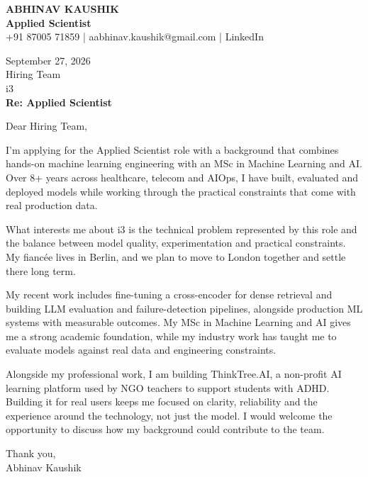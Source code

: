 \documentclass[10pt,a4paper]{article}
\begin{document}
\begin{center}
{\Large\bfseries ABHINAV KAUSHIK}\\[2pt]
{\bfseries Applied Scientist}\\[2pt]
+91 87005 71859 \quad | \quad aabhinav.kaushik@gmail.com \quad | \quad LinkedIn
\end{center}
\vspace{8pt}
September 27, 2026\\[6pt]
Hiring Team\\
i3\\[4pt]
\textbf{Re: Applied Scientist}

Dear Hiring Team,

I’m applying for the Applied Scientist role with a background that combines hands-on machine learning engineering with an MSc in Machine Learning and AI. Over 8+ years across healthcare, telecom and AIOps, I have built, evaluated and deployed models while working through the practical constraints that come with real production data.

What interests me about i3 is the technical problem represented by this role and the balance between model quality, experimentation and practical constraints. My fiancée lives in Berlin, and we plan to move to London together and settle there long term.

My recent work includes fine-tuning a cross-encoder for dense retrieval and building LLM evaluation and failure-detection pipelines, alongside production ML systems with measurable outcomes. My MSc in Machine Learning and AI gives me a strong academic foundation, while my industry work has taught me to evaluate models against real data and engineering constraints.

Alongside my professional work, I am building ThinkTree.AI, a non-profit AI learning platform used by NGO teachers to support students with ADHD. Building it for real users keeps me focused on clarity, reliability and the experience around the technology, not just the model. I would welcome the opportunity to discuss how my background could contribute to the team.

Thank you,\\
Abhinav Kaushik
\end{document}
